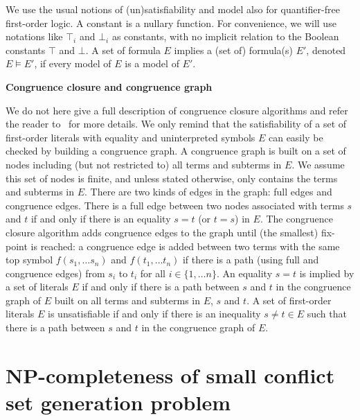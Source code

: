 \documentclass{easychair}
\begin{document}
We use the usual notions of (un)satisfiability and model also for
quantifier-free first-order logic.  A constant is a nullary function.  For
convenience, we will use notations like $\top_i$ and $\bot_i$ as constants, with
no implicit relation to the Boolean constants $\top$ and $\bot$.  A set of
formula $E$ implies a (set of) formula(s) $E'$, denoted $E\models E'$, if every
model of $E$ is a model of $E'$.

\vspace*{5pt}
\noindent \textbf{Congruence closure and congruence graph}

\noindent
We do not here give a full description of congruence closure algorithms and
refer the reader to~\cite{Nelson2,Downey1,Nieuwenhuis6} for more details.  We
only remind that the satisfiability of a set of first-order literals with
equality and uninterpreted symbols $E$ can easily be checked by building a
congruence graph.  A congruence graph is built on a set of nodes including (but
not restricted to) all terms and subterms in $E$.  We assume this set of nodes
is finite, and unless stated otherwise, only contains the terms and subterms in
$E$.  There are two kinds of edges in the graph: full edges and congruence
edges.  There is a full edge between two nodes associated with terms $s$ and $t$
if and only if there is an equality $s=t$ (or $t=s$) in $E$.  The congruence
closure algorithm adds congruence edges to the graph until (the smallest)
fix-point is reached: a congruence edge is added between two terms with the same
top symbol $f(s_1, \dots s_n)$ and $f(t_1, \dots t_n)$ if there is a path (using
full and congruence edges) from $s_i$ to $t_i$ for all $i\in \{1,\dots n\}$.  An
equality $s=t$ is implied by a set of literals $E$ if and only if there is a
path between $s$ and $t$ in the congruence graph of $E$ built on all terms and
subterms in $E$, $s$ and $t$.  A set of first-order literals $E$ is
unsatisfiable if and only if there is an inequality $s\neq t \in E$ such that
there is a path between $s$ and $t$ in the congruence graph of $E$.

\section*{NP-completeness of small conflict set generation problem}
\label{sec:npcomplete}
\end{document}

